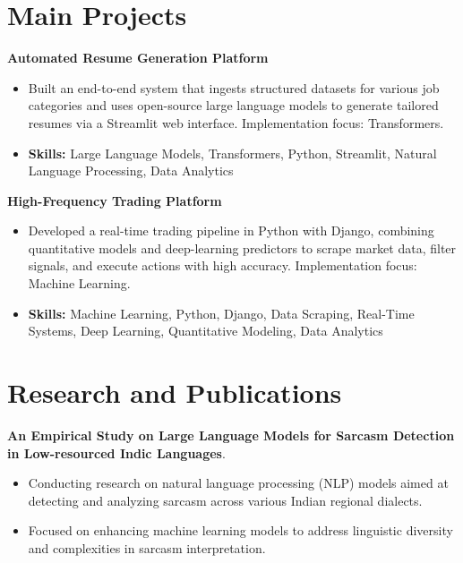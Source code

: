 \documentclass[a4paper,11pt]{article}
\begin{document}
\section{\textbf{Main Projects}}

\vspace{1mm}
  \textbf{Automated Resume Generation Platform  }
\vspace{-1.5mm} %
\begin{itemize}
  \item Built an end-to-end system that ingests structured datasets for various job categories and uses open-source large language models to generate tailored resumes via a Streamlit web interface. Implementation focus: Transformers.
\vspace{-3mm}
  \item \textbf{Skills:} Large Language Models, Transformers, Python, Streamlit, Natural Language Processing, Data Analytics
\end{itemize}


\vspace{1mm}
   \textbf{High-Frequency Trading Platform }
\vspace{-1.5mm} %
\begin{itemize}
  \item Developed a real-time trading pipeline in Python with Django, combining quantitative models and deep-learning predictors to scrape market data, filter signals, and execute actions with high accuracy. Implementation focus: Machine Learning.
\vspace{-3mm}
  \item \textbf{Skills:} Machine Learning, Python, Django, Data Scraping, Real-Time Systems, Deep Learning, Quantitative Modeling, Data Analytics
\end{itemize}



\section{\textbf{Research and Publications} \hfill }
\vspace{1mm}
  \textbf{An Empirical Study on Large Language Models for Sarcasm Detection in Low-resourced Indic Languages}.
\vspace{-1mm} %
\begin{itemize}
  \item Conducting research on natural language processing (NLP) models aimed at detecting and analyzing sarcasm across various Indian regional dialects.
\vspace{-3mm}
  \item Focused on enhancing machine learning models to address linguistic diversity and complexities in sarcasm interpretation.
\end{itemize}
\end{document}
